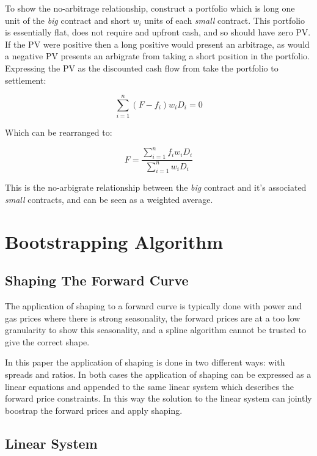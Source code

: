 \documentclass{article}
\begin{document}
To show the no-arbitrage relationship, construct a portfolio which is long one unit of the 
\emph{big} contract and short $w_i$ units of each \emph{small} contract. This portfolio
is essentially flat, does not require and upfront cash, and so should have zero PV. If
the PV were positive then a long positive would present an arbitrage, as would a 
negative PV presents an arbigrate from taking a short position in the portfolio.
Expressing the PV as the discounted cash flow from take the portfolio to settlement:

\begin{equation}
    \sum_{i=1}^{n}(F-f_i) w_i D_i = 0
\end{equation}

Which can be rearranged to:

\begin{equation}
    F = \frac{\sum_{i=1}^{n}f_i w_i D_i}{\sum_{i=1}^{n}w_i D_i}
\end{equation}

This is the no-arbigrate relationship between the \emph{big} contract and it's associated
\emph{small} contracts, and can be seen as a weighted average.

\section{Bootstrapping Algorithm}

\subsection{Shaping The Forward Curve}

The application of shaping to a forward curve is typically done with power and gas prices
where there is strong seasonality, the forward prices are at a too low granularity to
show this seasonality, and a spline algorithm cannot be trusted to give the correct shape.

In this paper the application of shaping is done in two different ways: with spreads 
and ratios. In both cases the application of shaping can be expressed as a linear
equations and appended to the same linear system which describes the forward price
constraints. In this way the solution to the linear system can jointly boostrap the
forward prices and apply shaping.


\subsection{Linear System}
\end{document}

